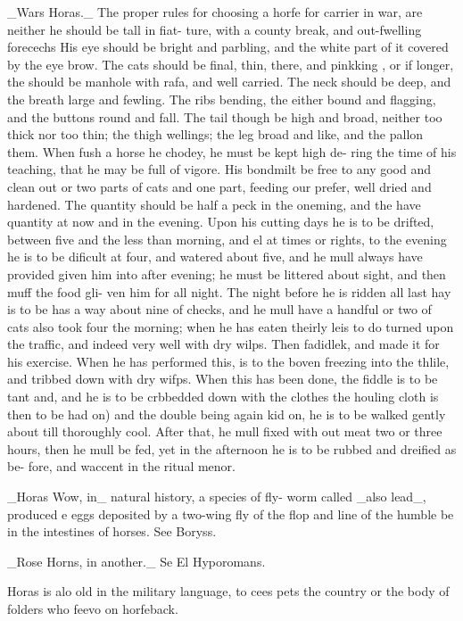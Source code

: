 \documentclass{article}
\begin{document}
\_Wars Horas.\_ The proper rules for choosing a horfe
for carrier in war, are neither he should be tall in fiat-
ture, with a county break, and out-fwelling forecechs
His eye should be bright and parbling, and the white
part of it covered by the eye brow. The cats should
be final, thin, there, and pinkking , or if longer, the
should be manhole with rafa, and well carried. The
neck should be deep, and the breath large and fewling.
The ribs bending, the either bound and flagging, and
the buttons round and fall. The tail though be high
and broad, neither too thick nor too thin; the thigh
wellings; the leg broad and like, and the pallon them.
When fush a horse he chodey, he must be kept high de-
ring the time of his teaching, that he may be full of
vigore. His bondmilt be free to any good and clean out
or two parts of cats and one part, feeding our prefer,
well dried and hardened. The quantity should be half
a peck in the oneming, and the have quantity at now
and in the evening. Upon his cutting days he is to be
drifted, between five and the less than morning, and
el at times or rights, to the evening he is to be dificult
at four, and watered about five, and he mull always
have provided given him into after evening; he must be
littered about sight, and then muff the food gli-
ven him for all night. The night before he is ridden
all last hay is to be has a way about nine of checks, and
he mull have a handful or two of cats also took four
the morning; when he has eaten theirly leis to do
turned upon the traffic, and indeed very well with dry
wilps. Then fadidlek, and made it for his exercise.
When he has performed this, is to the boven
freezing into the thlile, and tribbed down with dry
wifps. When this has been done, the fiddle is to be
tant and, and he is to be crbbedded down with the clothes
the houling cloth is then to be had on) and the double
being again kid on, he is to be walked gently about
till thoroughly cool. After that, he mull fixed with
out meat two or three hours, then he mull be fed, yet
in the afternoon he is to be rubbed and dreified as be-
fore, and waccent in the ritual menor.

\_Horas Wow, in\_ natural history, a species of fly-
worm called \_also lead\_, produced e eggs deposited by a
two-wing fly of the flop and line of the humble
be in the intestines of horses. See Boryss.

\_Rose Horns, in another.\_ Se El Hyporomans.

Horas is alo old in the military language, to cees
pets the country or the body of folders who feevo on
horfeback.
\end{document}
